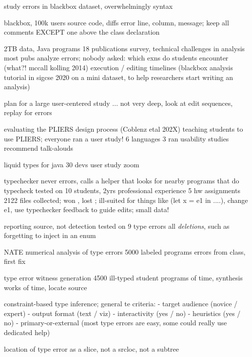 \documentclass[english,submission,cleveref]{programming}
\begin{document}
\cite{m-masters-2016}
study errors in blackbox dataset,
 overwhelmingly syntax

\cite{bkmu-sigcse-2014}
blackbox, 100k users
source code, diffs
error line, column, message;
keep all comments EXCEPT one above the class declaration


\cite{bask-icer-2018}
2TB data, Java programs
18 publications survey, technical challenges in analysis
 most pubs analyze errors;
nobody asked:
 which exns do students encounter (what?! mccall kolling 2014)
 execution / editing timelines
(blackbox analysis tutorial in sigcse 2020 on a mini dataset, to help researchers start writing an analysis)


\cite{t-hatra-2021}
plan for a large user-centered study 
... not very deep, look at edit sequences, replay for errors


\cite{cdhhjklwya-hatra-2020}
evaluating the PLIERS design process (Coblenz etal 202X)
teaching students to use PLIERS; everyone ran a user study!
6 languages
 3 ran usability studies
recommend talk-alouds


\cite{gstf-hatra-2021}
liquid types for java
30 devs user study
 zoom

\cite{lfgc-pldi-2007}
typechecker never errors,
 calls a helper that looks for nearby programs that do typecheck
tested on
 10 students, 2yrs professional experience
 5 hw assignments
 2122 files collected;
won , lost ;
ill-suited for things like (let x = e1 in ....),
 change e1,
 use typechecker feedback to guide edits;
small data!


\cite{w-popl-1986}
reporting source, not detection
tested on 9 type errors
 all \emph{deletions}, such as forgetting to inject in an enum

\cite{sscwj-oopsla-2017}
NATE numerical analysis of type errors
5000 labeled programs
 errors from class, first fix


\cite{sjw-jfp-2018}
type error witness generation
4500 ill-typed student programs
  of time, synthesis works
  of time, locate source


\cite{h-dissertiation-2005}
constraint-based type inference;
general te criteria:
- target audience (novice / expert)
- output format (text / viz)
- interactivity (yes / no)
- heuristics (yes / no)
- primary-or-external (most type errors are easy, some could really use dedicated help)


\cite{hw-scp-2004}
location of type error as a slice,
 not a srcloc,
 not a subtree
\end{document}
